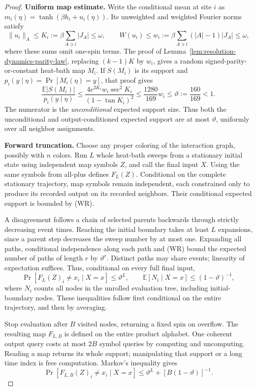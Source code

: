 \begin{proof}
\textbf{Uniform map estimate.}
Write the conditional mean at site \(i\) as
\(m_i(\eta)=\tanh(\beta h_i+u_i(\eta))\). Its unweighted and
weighted Fourier norms satisfy
\[
 \|u_i\|_A\le K_i:=\beta\sum_{A\ni i}|J_A|\le\omega,
 \qquad W(u_i)\le w_i:=\beta\sum_{A\ni i}(|A|-1)|J_A|\le\omega,
\]
where these sums omit one-spin terms. The proof of
Lemma~\ref{lem:resolution-dynamics-parity-law}, replacing
\((k-1)K\) by \(w_i\), gives a random signed-parity-or-constant
heat-bath map \(M_i\). If \(S(M_i)\) is its support and
\(p_i(y\mid\eta)=\Pr[M_i(\eta)=y]\), that proof gives
\[
 \frac{\mathbb E|S(M_i)|}{p_i(y\mid\eta)}
 \le\frac{4e^{2K_i}w_i\sec^2K_i}{(1-\tan K_i)^2}
 \le\frac{1280}{169}w_i
 \le\vartheta:=\frac{160}{169}<1.                 \tag{WR}
\]
The numerator is the \emph{unconditional} expected support size.
Thus both the unconditional and output-conditioned expected support
are at most \(\vartheta\), uniformly over all neighbor assignments.

\textbf{Forward truncation.}
Choose any proper coloring of the interaction graph, possibly with
\(n\) colors. Run \(L\) whole heat-bath sweeps from a stationary
initial state using independent map symbols \(Z\), and call the
final input \(X\). Using the same symbols from all-plus defines
\(F_L(Z)\). Conditional on the complete stationary trajectory, map
symbols remain independent, each constrained only to produce its
recorded output on its recorded neighbors. Their conditional expected
support is bounded by (WR).

A disagreement follows a chain of selected parents backwards through
strictly decreasing event times. Reaching the initial boundary takes
at least \(L\) expansions, since a parent step decreases the sweep
number by at most one. Expanding all paths, conditional independence
along each path and (WR) bound the expected number of paths of length
\(r\) by \(\vartheta^r\). Distinct paths may share events; linearity
of expectation suffices. Thus, conditional on every full final input,
\[
 \Pr[F_L(Z)_i\ne x_i\mid X=x]\le\vartheta^L,
 \qquad
 \mathbb E[N_i\mid X=x]\le(1-\vartheta)^{-1},     \tag{FW}
\]
where \(N_i\) counts all nodes in the unrolled evaluation tree,
including initial-boundary nodes. These inequalities follow first
conditional on the entire trajectory, and then by averaging.

Stop evaluation after \(B\) visited nodes, returning a fixed spin on
overflow. The resulting map \(F_{L,B}\) is defined on the entire
product alphabet. One coherent output query costs at most \(2B\)
symbol queries by computing and uncomputing. Reading a map returns its
whole support; manipulating that support or a long time index is free
computation. Markov's inequality gives
\[
 \Pr[F_{L,B}(Z)_i\ne x_i\mid X=x]
 \le\vartheta^L+[B(1-\vartheta)]^{-1}.             \tag{TF}
\]


\end{proof}
